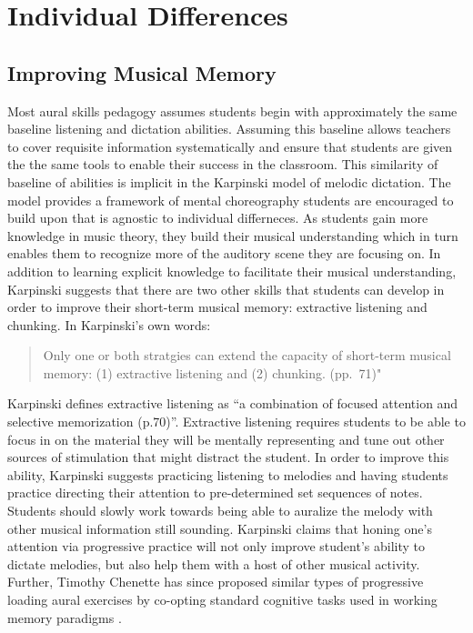 \documentclass[]{book}
\begin{document}
\hypertarget{individual-differences-1}{%
\section{Individual Differences}\label{individual-differences-1}}

\hypertarget{improving-musical-memory}{%
\subsection{Improving Musical Memory}\label{improving-musical-memory}}

Most aural skills pedagogy assumes students begin with approximately the same baseline listening and dictation abilities.
Assuming this baseline allows teachers to cover requisite information systematically and ensure that students are given the the same tools to enable their success in the classroom.
This similarity of baseline of abilities is implicit in the Karpinski model of melodic dictation.
The model provides a framework of mental choreography students are encouraged to build upon that is agnostic to individual differneces.
As students gain more knowledge in music theory, they build their musical understanding which in turn enables them to recognize more of the auditory scene they are focusing on.
In addition to learning explicit knowledge to facilitate their musical understanding, Karpinski suggests that there are two other skills that students can develop in order to improve their short-term musical memory: extractive listening and chunking.
In Karpinski's own words:

\begin{quote}
Only one or both stratgies can extend the capacity of short-term musical memory: (1) extractive listening and (2) chunking. (pp.~71)"
\end{quote}

Karpinski defines extractive listening as ``a combination of focused attention and selective memorization (p.70)''.
Extractive listening requires students to be able to focus in on the material they will be mentally representing and tune out other sources of stimulation that might distract the student.
In order to improve this ability, Karpinski suggests practicing listening to melodies and having students practice directing their attention to pre-determined set sequences of notes.
Students should slowly work towards being able to auralize the melody with other musical information still sounding.
Karpinski claims that honing one's attention via progressive practice will not only improve student's ability to dictate melodies, but also help them with a host of other musical activity.
Further, Timothy Chenette has since proposed similar types of progressive loading aural exercises by co-opting standard cognitive tasks used in working memory paradigms \citep{chenetteReframingAuralSkills2019} .
\end{document}
